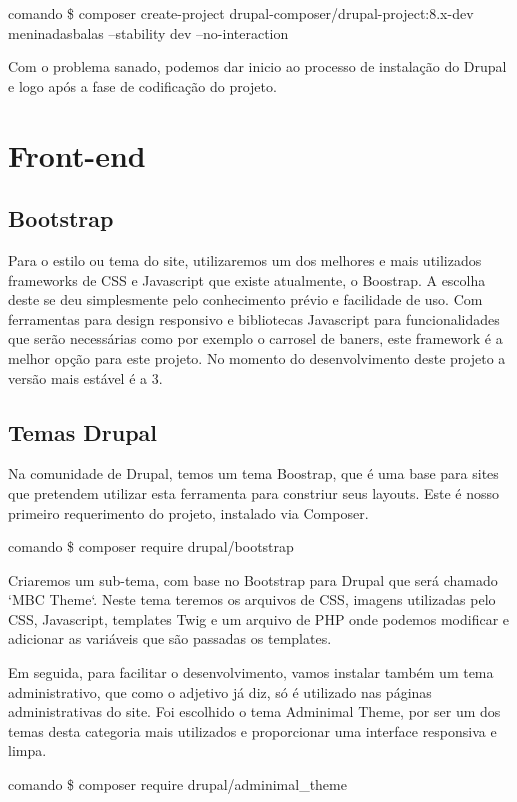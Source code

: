 \documentclass[
	12pt,				%
    oneside,			%
	a4paper,			%
	english,			%
	french,				%
	spanish,			%
	brazil				%
	]{abntex2}
\begin{document}
\TODO comando \$ composer create-project drupal-composer/drupal-project:8.x-dev meninadasbalas --stability dev --no-interaction

Com o problema sanado, podemos dar inicio ao processo de instalação do Drupal e logo após a fase de codificação do projeto.

\section{Front-end}

\subsection{Bootstrap}
Para o estilo ou tema do site, utilizaremos um dos melhores e mais utilizados frameworks de CSS e Javascript \cite{Bootstrap} que existe atualmente, o Boostrap. A escolha deste se deu simplesmente pelo conhecimento prévio e facilidade de uso. Com ferramentas para design responsivo e bibliotecas Javascript para funcionalidades que serão necessárias como por exemplo o carrosel de baners, este framework é a melhor opção para este projeto. No momento do desenvolvimento deste projeto a versão mais estável é a 3.

\subsection{Temas Drupal}
Na comunidade de Drupal, temos um tema Boostrap, que é uma base para sites que pretendem utilizar esta ferramenta para constriur seus layouts. Este é nosso primeiro requerimento do projeto, instalado via Composer.

\TODO comando \$ composer require drupal/bootstrap

Criaremos um sub-tema, com base no Bootstrap para Drupal que será chamado `MBC Theme`. Neste tema teremos os arquivos de CSS, imagens utilizadas pelo CSS, Javascript, templates Twig e um arquivo de PHP onde podemos modificar e adicionar as variáveis que são passadas os templates. 

Em seguida, para facilitar o desenvolvimento, vamos instalar também um tema administrativo, que como o adjetivo já diz, só é utilizado nas páginas administrativas do site. Foi escolhido o tema Adminimal Theme, por ser um dos temas desta categoria mais utilizados e proporcionar uma interface responsiva e limpa.

\TODO comando \$ composer require drupal/adminimal_theme
\end{document}
